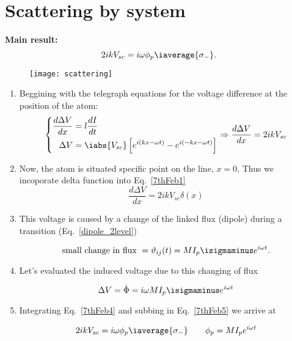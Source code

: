 \section{Scattering by system \cite{Astafiev2010}}
\begin{framed}\noindent
  \textbf{Main result:}
  \begin{equation}\label{key}
    2ikV_{sc} = i\omega \phi_p\iaverage{\sigma_{-}}.
  \end{equation}
\end{framed}

\begin{figure}[h]
  \centering \texttt{[image: scattering]}
\end{figure}

\noindent

\begin{enumerate}
\item Beggining with the telegraph equations for the voltage difference
  at the position of the atom:
  \begin{equation}\label{7thFeb1}
    \left\lbrace\begin{aligned}
        \frac{d\Delta V}{dx} & = l\frac{dI}{dt}\\
        \Delta V & = \iabs{V_{sc}}\left[e^{i(kx - \omega t)} - e^{i(-kx - \omega t)}\right]
      \end{aligned}\right. \Rightarrow \frac{d\Delta V}{dx} = 2ikV_{sc}
  \end{equation}

\item Now, the atom is situated specific point  on the line, $ x = 0 $,
  Thus we incoporate delta function into Eq.~\eqref{7thFeb1}
  \begin{equation}\label{7thFeb4}
    \frac{d\Delta V}{dx} = 2ikV_{sc}\delta(x)
  \end{equation}

\item This  voltage is caused by  a change of the  linked flux (dipole)
  during a transition (Eq.~\eqref{dipole_2level})

  \begin{equation}\label{key}
    \text{small change in flux } = \vartheta_{ij}(t) = MI_p\isigmaminus e^{i\omega t}.
  \end{equation}

\item Let's evaluated the induced voltage due to this changing of flux

  \begin{equation}\label{7thFeb5}
    \Delta V = \dot{\Phi} = i\omega MI_p\isigmaminus e^{i\omega t}
  \end{equation}

\item     Integrating     Eq.~\eqref{7thFeb4}    and     subbing     in
  Eq.~\eqref{7thFeb5} we arrive at

  \begin{equation}\label{7thFev5}
    2ikV_{sc} = i\omega\phi_p\iaverage{\sigma_{-}}\qquad \phi_p = MI_pe^{i\omega t}
  \end{equation}

\end{enumerate}
\newpage

